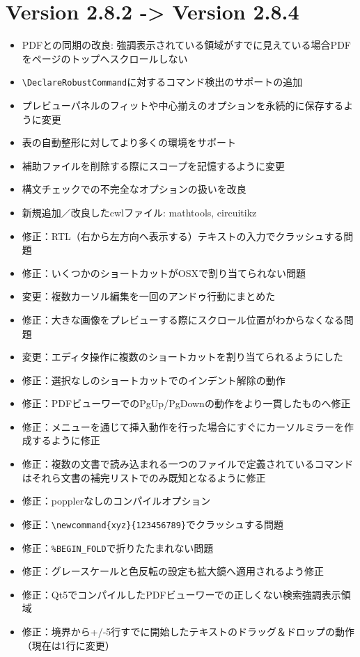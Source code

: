 \section{Version 2.8.2 -\textgreater{} Version 2.8.4}

\begin{itemize}
\item
  PDFとの同期の改良:
  強調表示されている領域がすでに見えている場合PDFをページのトップへスクロールしない
\item
  \verb+\DeclareRobustCommand+に対するコマンド検出のサポートの追加
\item
  プレビューパネルのフィットや中心揃えのオプションを永続的に保存するように変更
\item
  表の自動整形に対してより多くの環境をサポート
\item
  補助ファイルを削除する際にスコープを記憶するように変更
\item
  構文チェックでの不完全なオプションの扱いを改良
\item
  新規追加／改良したcwlファイル: mathtools, circuitikz
\item
  修正：RTL（右から左方向へ表示する）テキストの入力でクラッシュする問題
\item
  修正：いくつかのショートカットがOSXで割り当てられない問題
\item
  変更：複数カーソル編集を一回のアンドゥ行動にまとめた
\item
  修正：大きな画像をプレビューする際にスクロール位置がわからなくなる問題
\item
  変更：エディタ操作に複数のショートカットを割り当てられるようにした
\item
  修正：選択なしのショートカットでのインデント解除の動作
\item
  修正：PDFビューワーでのPgUp/PgDownの動作をより一貫したものへ修正
\item
  修正：メニューを通じて挿入動作を行った場合にすぐにカーソルミラーを作成するように修正
\item
  修正：複数の文書で読み込まれる一つのファイルで定義されているコマンドはそれら文書の補完リストでのみ既知となるように修正
\item
  修正：popplerなしのコンパイルオプション
\item
  修正：\verb+\newcommand{xyz}{123456789}+でクラッシュする問題
\item
  修正：\verb+%BEGIN_FOLD+で折りたたまれない問題
\item
  修正：グレースケールと色反転の設定も拡大鏡へ適用されるよう修正
\item
  修正：Qt5でコンパイルしたPDFビューワーでの正しくない検索強調表示領域
\item
  修正：境界から+/-5行すでに開始したテキストのドラッグ＆ドロップの動作（現在は1行に変更）
\end{itemize}

